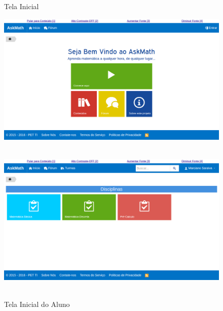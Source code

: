 \begin{figure}[H]
  \centering
  \begin{minipage}[b]{0.49\textwidth}
	\caption{Tela Inicial}
    \includegraphics[width=\textwidth]{figuras/askmath/1}
    \\
    \\
  \end{minipage}
  \hfill
  \begin{minipage}[b]{0.49\textwidth}
	\caption{Tela Inicial do Aluno}
    \includegraphics[width=\textwidth]{figuras/askmath/2}
  	\\
    \\
  \end{minipage}
 

\end{figure}
